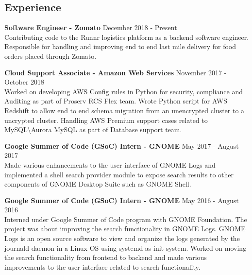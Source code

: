 \documentclass[11pt,margin, centered]{res}
\begin{document}
\begin{resume}



\section{Experience}
\vspace{8mm}

\textbf{Software Engineer - Zomato} \hfill December 2018 - Present\\
Contributing code to the Runnr logistics platform as a backend software engineer. Responsible for handling and improving end to end last mile delivery for food orders placed through Zomato.

\textbf{Cloud Support Associate - Amazon Web Services} \hfill November 2017 - October 2018\\
Worked on developing AWS Config rules in Python for security, compliance and Auditing as part of Proserv RCS Flex team.
Wrote Python script for AWS Redshift to allow end to end schema migration from an unencrypted cluster to a uncrypted cluster. Handling AWS Premium support cases related to MySQL\textbackslash Aurora MySQL as part of Database support team.

\vspace{2mm}

\textbf{Google Summer of Code (GSoC) Intern - GNOME} \hfill May 2017 - August 2017\\
Made various enhancements to the user interface of GNOME Logs and implemented a shell search provider module to expose search results to other components of GNOME Desktop Suite such as GNOME Shell.

\vspace{2mm}

\textbf{Google Summer of Code (GSoC) Intern - GNOME} \hfill May 2016 - August 2016\\
Interned under Google Summer of Code program with GNOME Foundation. The project was about improving the search functionality in GNOME Logs. GNOME Logs is an open source software to view and organize the logs generated by the journald daemon in a Linux OS using systemd as init system. Worked on moving the search functionality from frontend to backend and made various improvements to the user interface related to search functionality.


\end{resume}
\end{document}
